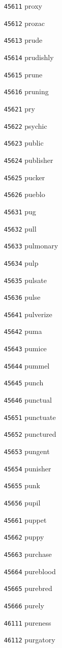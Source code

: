 \documentclass[twoside,11pt]{article}
\begin{document}
\begin{multicols}{5}
\begin{enumerate}
\item[\texttt{45611}] proxy
\item[\texttt{45612}] prozac
\item[\texttt{45613}] prude
\item[\texttt{45614}] prudishly
\item[\texttt{45615}] prune
\item[\texttt{45616}] pruning
\item[\texttt{45621}] pry
\item[\texttt{45622}] psychic
\item[\texttt{45623}] public
\item[\texttt{45624}] publisher
\item[\texttt{45625}] pucker
\item[\texttt{45626}] pueblo
\item[\texttt{45631}] pug
\item[\texttt{45632}] pull
\item[\texttt{45633}] pulmonary
\item[\texttt{45634}] pulp
\item[\texttt{45635}] pulsate
\item[\texttt{45636}] pulse
\item[\texttt{45641}] pulverize
\item[\texttt{45642}] puma
\item[\texttt{45643}] pumice
\item[\texttt{45644}] pummel
\item[\texttt{45645}] punch
\item[\texttt{45646}] punctual
\item[\texttt{45651}] punctuate
\item[\texttt{45652}] punctured
\item[\texttt{45653}] pungent
\item[\texttt{45654}] punisher
\item[\texttt{45655}] punk
\item[\texttt{45656}] pupil
\item[\texttt{45661}] puppet
\item[\texttt{45662}] puppy
\item[\texttt{45663}] purchase
\item[\texttt{45664}] pureblood
\item[\texttt{45665}] purebred
\item[\texttt{45666}] purely
\item[\texttt{46111}] pureness
\item[\texttt{46112}] purgatory

\end{enumerate}
\end{multicols}
\end{document}
